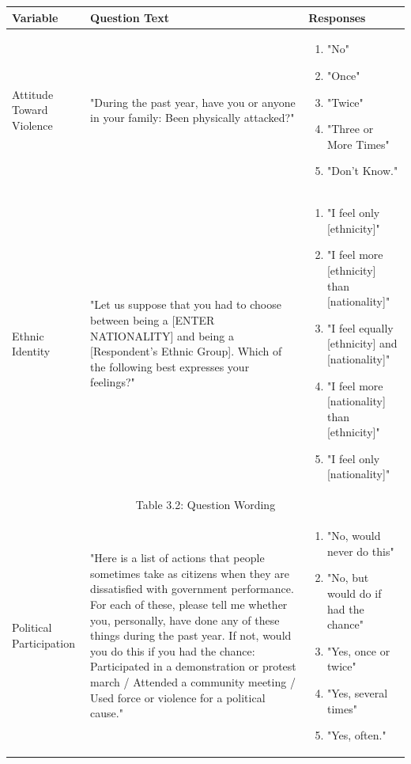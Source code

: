 \documentclass[12pt,]{book}
\theoremstyle{definition}
\theoremstyle{definition}
\theoremstyle{definition}
\theoremstyle{remark}
\begin{document}
\singlespacing

\begin{longtable}{p{3cm} p{6cm} p{6cm}}
Variable & Question Text & Responses \\
\hline
Attitude Toward Violence & "During the past year, have you or anyone in your family: Been physically attacked?" & \begin{enumerate}
\item "No"
\item "Once"
\item "Twice"
\item "Three or More Times"
\item "Don't Know."
\end{enumerate} \\
\hline
Ethnic Identity & "Let us suppose that you had to choose between being a [ENTER NATIONALITY] and being a [Respondent’s Ethnic Group]. Which of the following best expresses your feelings?" & \begin{enumerate}
\item "I feel only [ethnicity]"
\item "I feel more [ethnicity] than [nationality]"
\item"I feel equally [ethnicity] and [nationality]"
\item "I feel more [nationality] than [ethnicity]"
\item "I feel only [nationality]"
\end{enumerate} \\
\hline
\multicolumn{3}{c}{Table 3.2: Question Wording}\\
Political Participation & "Here is a list of actions that people sometimes take as citizens when they are dissatisfied with government performance. For each of these, please tell me whether you, personally, have done any of these things during the past year. If not, would you do this if you had the chance: Participated in a demonstration or protest march / Attended a community meeting / Used force or violence for a political cause." & \begin{enumerate}
\item "No, would never do this"
\item "No, but would do if had the chance"
\item "Yes, once or twice"
\item "Yes, several times"
\item "Yes, often."
\end{enumerate} \\
\hline

\end{longtable}
\end{document}
